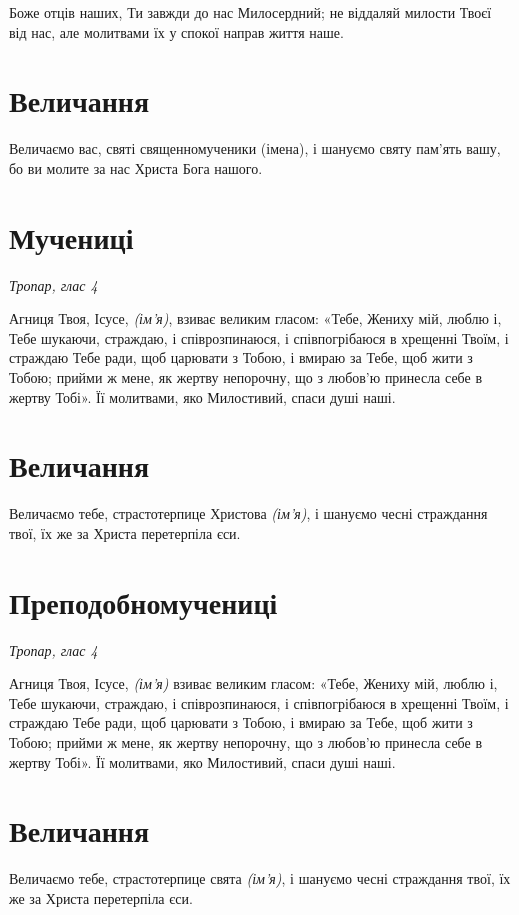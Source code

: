 \documentclass[chapters.tex]{subfiles}
\begin{document}
Боже отців наших, Ти завжди до нас Милосердний; не віддаляй милости Твоєї від нас, але молитвами їх у спокої направ життя наше.

\section{Величання}

Величаємо вас, святі священномученики (імена), і шануємо святу пам’ять вашу, бо ви молите за нас Христа Бога нашого.

\section{Мучениці}
\emph{Тропар, глас 4}

Агниця Твоя, Ісусе, \emph{(ім’я)}, взиває великим гласом: «Тебе, Жениху мій, люблю і, Тебе шукаючи, страждаю, і співрозпинаюся, і співпогрібаюся в хрещенні Твоїм, і страждаю Тебе ради, щоб царювати з Тобою, і вмираю за Тебе, щоб жити з Тобою; прийми ж мене, як жертву непорочну, що з любов’ю принесла себе в жертву Тобі». Її молитвами, яко Милостивий, спаси душі наші.

\section{Величання}

Величаємо тебе, страстотерпице Христова \emph{(ім’я)}, і шануємо чесні страждання твої, їх же за Христа перетерпіла єси.

\section{Преподобномучениці}
\emph{Тропар, глас 4}

Агниця Твоя, Ісусе, \emph{(ім’я)} взиває великим гласом: «Тебе, Жениху мій, люблю і, Тебе шукаючи, страждаю, і співрозпинаюся, і співпогрібаюся в хрещенні Твоїм, і страждаю Тебе ради, щоб царювати з Тобою, і вмираю за Тебе, щоб жити з Тобою; прийми ж мене, як жертву непорочну, що з любов’ю принесла себе в жертву Тобі». Її молитвами, яко Милостивий, спаси душі наші.

\section{Величання}

Величаємо тебе, страстотерпице свята \emph{(ім’я)}, і шануємо чесні страждання твої, їх же за Христа перетерпіла єси.
\end{document}
